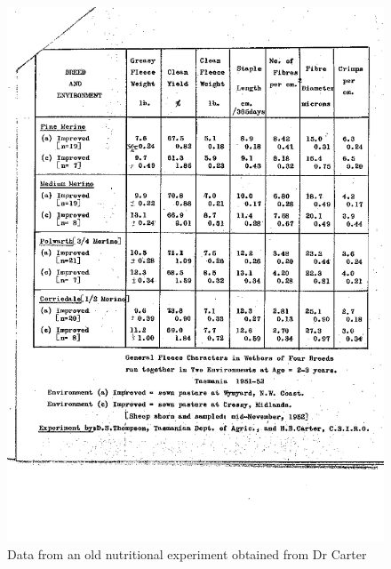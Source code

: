 %

\begin{figure}[h]
  \centering
   \includegraphics[width=1.1\textwidth]{carter51b.png}
  \caption{Data from an old nutritional experiment obtained from Dr Carter}
  \label{fig:thomcart2}
\end{figure}

%

